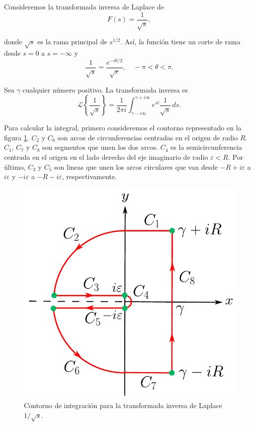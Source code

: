 \begin{ejemplo} \label{Inv_Laplace_ej_branch}
    Consideremos la transformada inversa de Laplace de
    $$F(s) = \frac{1}{\sqrt{s}},$$

    donde $\sqrt{s}$ es la rama principal de $s^{1/2}$. Así, la función tiene un corte de rama desde $s = 0$ a $s = - \infty$ y
    $$\frac{1}{\sqrt{s}} = \frac{e^{-i \theta/2}}{\sqrt{r}}, \quad - \pi < \theta < \pi.$$

    Sea $\gamma$ cualquier número positivo. La transformada inversa es
    $$\mathcal{L}\left\{ \frac{1}{\sqrt{s}} \right\} = \frac{1}{2\pi i} \int_{\gamma - i\infty}^{\gamma + i \infty} e^{st} \frac{1}{\sqrt{s}} \,ds.$$

    Para calcular la integral, primero consideremos el contorno representado en la figura \ref{fig:InvLaplaceBranchCut}. $C_2$ y $C_6$  son arcos de circunferencias centradas en el origen de radio $R$. $C_1$, $C_7$ y $C_8$ son segmentos que unen los dos arcos. $C_4$ es la semicircunferencia centrada en el origen en el lado derecho del eje imaginario de radio $\varepsilon < R$. Por último, $C_3$ y $C_5$ son lineas que unen los arcos circulares que van desde $-R + i\varepsilon$ a $i \varepsilon$ y $-i \varepsilon$ a $-R - i \varepsilon$, respectivamente.

    \begin{figure}[H]
        \centering
        \includegraphics[scale = 0.6]{Figuras/InversaLaplace2.pdf}
        \caption{Contorno de integración para la transformada inversa de Laplace $1/\sqrt{s}$.}
        \label{fig:InvLaplaceBranchCut}
    \end{figure}


\end{ejemplo}
